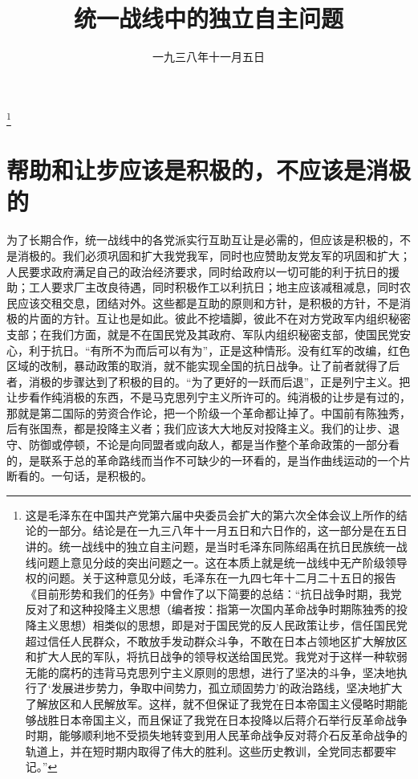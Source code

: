 
\title{统一战线中的独立自主问题}
\date{一九三八年十一月五日}
\thanks{这是毛泽东在中国共产党第六届中央委员会扩大的第六次全体会议上所作的结论的一部分。结论是在一九三八年十一月五日和六日作的，这一部分是在五日讲的。统一战线中的独立自主问题，是当时毛泽东同陈绍禹在抗日民族统一战线问题上意见分歧的突出问题之一。这在本质上就是统一战线中无产阶级领导权的问题。关于这种意见分歧，毛泽东在一九四七年十二月二十五日的报告《目前形势和我们的任务》中曾作了以下简要的总结：“抗日战争时期，我党反对了和这种投降主义思想（编者按：指第一次国内革命战争时期陈独秀的投降主义思想）相类似的思想，即是对于国民党的反人民政策让步，信任国民党超过信任人民群众，不敢放手发动群众斗争，不敢在日本占领地区扩大解放区和扩大人民的军队，将抗日战争的领导权送给国民党。我党对于这样一种软弱无能的腐朽的违背马克思列宁主义原则的思想，进行了坚决的斗争，坚决地执行了‘发展进步势力，争取中间势力，孤立顽固势力’的政治路线，坚决地扩大了解放区和人民解放军。这样，就不但保证了我党在日本帝国主义侵略时期能够战胜日本帝国主义，而且保证了我党在日本投降以后蒋介石举行反革命战争时期，能够顺利地不受损失地转变到用人民革命战争反对蒋介石反革命战争的轨道上，并在短时期内取得了伟大的胜利。这些历史教训，全党同志都要牢记。”}
\maketitle


\section{帮助和让步应该是积极的，不应该是消极的}

为了长期合作，统一战线中的各党派实行互助互让是必需的，但应该是积极的，不是消极的。我们必须巩固和扩大我党我军，同时也应赞助友党友军的巩固和扩大；人民要求政府满足自己的政治经济要求，同时给政府以一切可能的利于抗日的援助；工人要求厂主改良待遇，同时积极作工以利抗日；地主应该减租减息，同时农民应该交租交息，团结对外。这些都是互助的原则和方针，是积极的方针，不是消极的片面的方针。互让也是如此。彼此不挖墙脚，彼此不在对方党政军内组织秘密支部；在我们方面，就是不在国民党及其政府、军队内组织秘密支部，使国民党安心，利于抗日。“有所不为而后可以有为”，正是这种情形。没有红军的改编，红色区域的改制，暴动政策的取消，就不能实现全国的抗日战争。让了前者就得了后者，消极的步骤达到了积极的目的。“为了更好的一跃而后退”，正是列宁主义。把让步看作纯消极的东西，不是马克思列宁主义所许可的。纯消极的让步是有过的，那就是第二国际的劳资合作论，把一个阶级一个革命都让掉了。中国前有陈独秀，后有张国焘，都是投降主义者；我们应该大大地反对投降主义。我们的让步、退守、防御或停顿，不论是向同盟者或向敌人，都是当作整个革命政策的一部分看的，是联系于总的革命路线而当作不可缺少的一环看的，是当作曲线运动的一个片断看的。一句话，是积极的。

